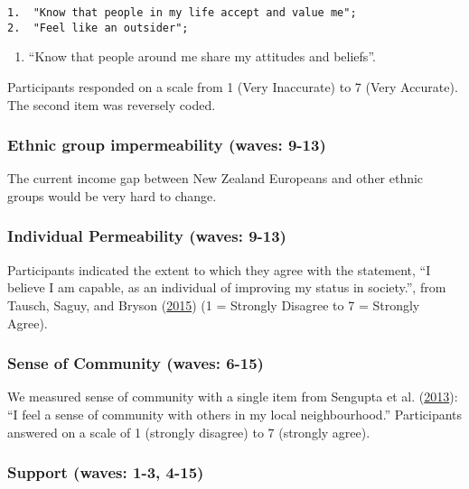 \documentclass[
  singlecolumn]{report}
\providecommand{\tightlist}{%
  \setlength{\itemsep}{0pt}\setlength{\parskip}{0pt}}\usepackage{longtable,booktabs,array}
\begin{document}
\begin{verbatim}
1.  "Know that people in my life accept and value me";
2.  "Feel like an outsider";
\end{verbatim}

\begin{enumerate}
\def\labelenumi{\arabic{enumi}.}
\setcounter{enumi}{2}
\tightlist
\item
  ``Know that people around me share my attitudes and beliefs''.
\end{enumerate}

Participants responded on a scale from 1 (Very Inaccurate) to 7 (Very
Accurate). The second item was reversely coded.

\hypertarget{ethnic-group-impermeability-waves-9-13}{%
\subsubsection{Ethnic group impermeability (waves:
9-13)}\label{ethnic-group-impermeability-waves-9-13}}

The current income gap between New Zealand Europeans and other ethnic
groups would be very hard to change.

\hypertarget{individual-permeability-waves-9-13}{%
\subsubsection{Individual Permeability (waves:
9-13)}\label{individual-permeability-waves-9-13}}

Participants indicated the extent to which they agree with the
statement, ``I believe I am capable, as an individual of improving my
status in society.'', from Tausch, Saguy, and Bryson
(\protect\hyperlink{ref-tausch2015}{2015}) (1 = Strongly Disagree to 7 =
Strongly Agree).

\hypertarget{sense-of-community-waves-6-15}{%
\subsubsection{Sense of Community (waves:
6-15)}\label{sense-of-community-waves-6-15}}

We measured sense of community with a single item from Sengupta et al.
(\protect\hyperlink{ref-sengupta2013}{2013}): ``I feel a sense of
community with others in my local neighbourhood.'' Participants answered
on a scale of 1 (strongly disagree) to 7 (strongly agree).

\hypertarget{support-waves-1-3-4-15}{%
\subsubsection{Support (waves: 1-3,
4-15)}\label{support-waves-1-3-4-15}}
\end{document}
